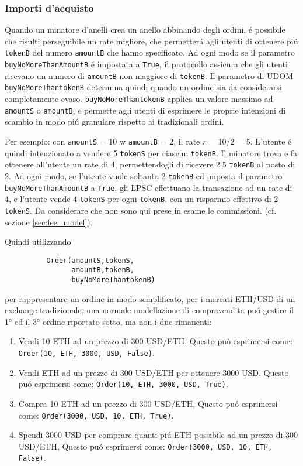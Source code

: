 \documentclass[UTF8,nofonts]{article}
\begin{document}
\begin{multicols}{2}
\subsubsection{Importi d'acquisto}

Quando un minatore d'anelli crea  un anello abbinando degli ordini, \'e possibile che risulti perseguibile un rate migliore, che permetter\'a agli utenti di ottenere pi\'u \verb|tokenB| del numero \verb|amountB| che hanno specificato.  Ad ogni modo se il parametro \verb|buyNoMoreThanAmountB| \'e impostata a \verb|True|, il protocollo assicura che gli utenti ricevano un numero di \verb|amountB| non maggiore di \verb|tokenB|. Il parametro di UDOM \verb|buyNoMoreThantokenB| determina quindi quando un ordine sia da considerarsi completamente evaso. \verb|buyNoMoreThantokenB| applica un valore massimo ad \verb|amountS| o \verb|amountB|, e permette agli utenti di esprimere le proprie intenzioni di scambio in modo pi\'u granulare rispetto ai tradizionali ordini.

Per esempio: con  \verb|amountS| = 10 w \verb|amountB| = 2, il  rate $r$ = 10/2 = 5. L'utente \'e quindi intenzionato a vendere 5 \verb|tokenS| per ciascun \verb|tokenB|. Il minatore trova e fa ottenere all'utente un rate di 4, permettendogli di ricevere 2.5 \verb|tokenB| al posto di 2. Ad ogni modo, se l'utente vuole soltanto 2 \verb|tokenB| ed imposta il parametro \verb|buyNoMoreThanAmountB| a \verb|True|, gli LPSC effettuano la transazione ad un rate di 4, e l'utente vende 4 \verb|tokenS| per ogni \verb|tokenB|, con un risparmio effettivo di 2 \verb|tokenS|. Da considerare che non sono qui prese in esame le commissioni. (cf. sezione \ref{sec:fee_model}).

Quindi utilizzando


\begin{verbatim}
	      Order(amountS,tokenS,
	            amountB,tokenB,
	            buyNoMoreThantokenB)
\end{verbatim}

per rappresentare un ordine in modo semplificato, per i mercati ETH/USD di un exchange tradizionale, una normale modellazione di compravendita pu\'o gestire il 1° ed il 3° ordine riportato sotto, ma non i due rimanenti:

\begin{enumerate}
	\item Vendi 10 ETH ad un prezzo di 300 USD/ETH. Questo può esprimersi come: \verb|Order(10, ETH, 3000, USD, False)|.
	\item Vendi  ETH  ad un prezzo di 300  USD/ETH  per ottenere  3000  USD.  Questo pu\'o esprimersi come: \verb|Order(10, ETH, 3000, USD, True)|.
	\item Compra 10 ETH ad un prezzo di 300 USD/ETH, Questo pu\'o esprimersi come: \verb|Order(3000, USD, 10, ETH, True)|.
	\item Spendi 3000  USD  per comprare quanti pi\'u  ETH possibile ad un prezzo di 300  USD/ETH,  Questo pu\'o esprimersi come: \verb|Order(3000, USD, 10, ETH, False)|.
\end{enumerate}




\end{multicols}
\end{document}
